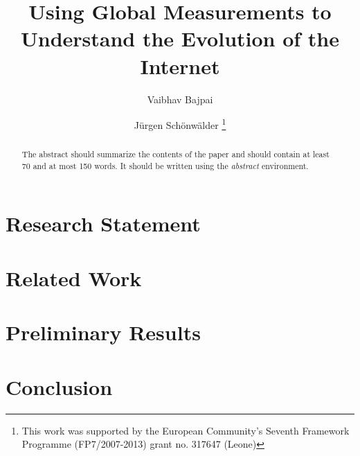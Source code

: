 \documentclass[a4paper]{llncs}
\begin{document}
\mainmatter  %

\title{Using Global Measurements to Understand the Evolution of the Internet}

\author{Vaibhav Bajpai \and Jürgen Schönwälder%
\thanks{This work was supported by the European Community’s Seventh Framework
Programme (FP7/2007-2013) grant no. 317647 (Leone)}}
\maketitle

\begin{abstract}
The abstract should summarize the contents of the paper and should
contain at least 70 and at most 150 words. It should be written using the
\emph{abstract} environment.
\end{abstract}


\section{Research Statement}
\label{sec:rstatement}
\section{Related Work}
\label{sec:relatedwork}
\section{Preliminary Results}
\label{sec:preliminaryresults}
\section{Conclusion}
\label{sec:conclusion}





\end{document}
